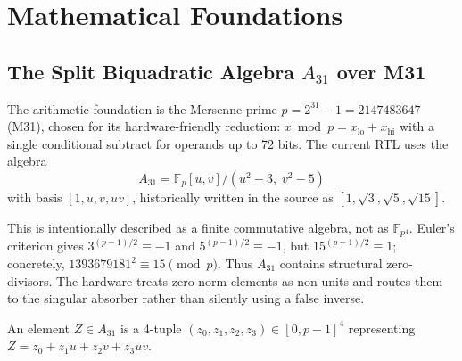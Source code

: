 \documentclass[conference]{IEEEtran}
\begin{document}
\vspace{0.5em}
\noindent{}
\vspace{0.5em}


\section{Mathematical Foundations}
\label{sec:math}

\subsection{The Split Biquadratic Algebra $A_{31}$ over M31}

The arithmetic foundation is the Mersenne prime $p = 2^{31} - 1 =
2147483647$ (M31), chosen for its hardware-friendly reduction: $x \bmod p
= x_{\text{lo}} + x_{\text{hi}}$ with a single conditional subtract for
operands up to 72 bits. The current RTL uses the algebra
\begin{equation}
A_{31}=\mathbb{F}_p[u,v]/(u^2-3,\;v^2-5)
\end{equation}
with basis $[1,u,v,uv]$, historically written in the source as
$[1,\sqrt{3},\sqrt{5},\sqrt{15}]$.

This is intentionally described as a finite commutative algebra, not as
$\mathbb{F}_{p^4}$. Euler's criterion gives $3^{(p-1)/2}\equiv -1$ and
$5^{(p-1)/2}\equiv -1$, but $15^{(p-1)/2}\equiv 1$; concretely,
$1393679181^2\equiv 15\pmod p$. Thus $A_{31}$ contains structural
zero-divisors. The hardware treats zero-norm elements as non-units and routes
them to the singular absorber rather than silently using a false inverse.

An element $Z \in A_{31}$ is a 4-tuple $(z_0, z_1, z_2, z_3) \in
[0, p-1]^4$ representing $Z = z_0 + z_1u + z_2v + z_3uv$.
\end{document}
